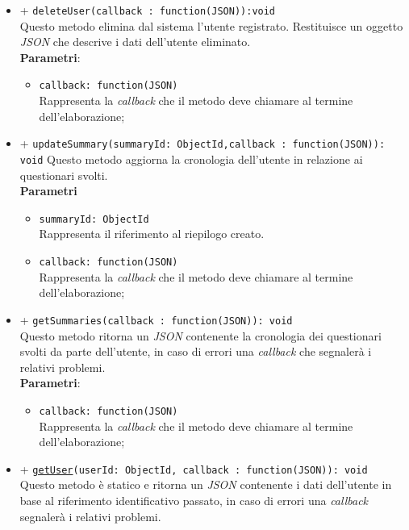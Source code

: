 \begin{itemize}
\begin{itemize}
		\item		
		+ \texttt{deleteUser(callback : function(JSON)):void} \\	
		Questo metodo elimina dal sistema l'utente registrato. Restituisce un oggetto \textit{JSON} che descrive i dati dell'utente eliminato.	\\	
		\textbf{Parametri}: 
			\begin{itemize}
			\item	
				\texttt{callback: function(JSON)} \\
				Rappresenta la \textit{callback} che il metodo deve chiamare al termine dell'elaborazione;		
			\end{itemize}
		\item	
		+ \texttt{updateSummary(summaryId: ObjectId,callback : function(JSON)): void}	
		Questo metodo aggiorna la cronologia dell'utente in relazione ai questionari svolti.\\	
		\textbf{Parametri} 
			\begin{itemize}
			\item	
				\texttt{summaryId: ObjectId} \\
				Rappresenta il riferimento al riepilogo creato.
			\item	
				\texttt{callback: function(JSON)} \\
				Rappresenta la \textit{callback} che il metodo deve chiamare al termine dell'elaborazione;	
			\end{itemize}
		\item	
		+ \texttt{getSummaries(callback : function(JSON)): void}\\	
		Questo metodo ritorna un \textit{JSON} contenente la cronologia dei questionari svolti da parte dell'utente, in caso di errori una \textit{callback} che segnalerà i relativi problemi.\\
		\textbf{Parametri}: 
			\begin{itemize}
			\item	
				\texttt{callback: function(JSON)} \\
				Rappresenta la \textit{callback} che il metodo deve chiamare al termine dell'elaborazione;	
			\end{itemize}	
		\item			
		+ \texttt{\underline{getUser}(userId:  ObjectId, callback : function(JSON)): void}	\\	
			Questo metodo è statico e ritorna un \textit{JSON} contenente i dati dell'utente in base al riferimento identificativo passato, in caso di errori una \textit{callback}  segnalerà i relativi problemi.\\

\end{itemize}
\end{itemize}
